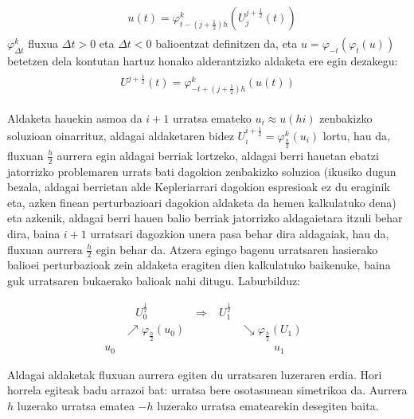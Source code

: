 \begin{align}\begin{split}
\label{eq: uUaldaketa}
&u(t) = \varphi_{t-(j+\frac{1}{2})h}^k\left(U_j^{j+\frac{1}{2}}(t)\right)
\end{split}
\end{align} 
$\varphi_{\Delta t}^k$ fluxua $\Delta t>0$ eta $\Delta t <0$ balioentzat definitzen da, eta  $u= \varphi_{-t}(\varphi_{t}(u))$ betetzen dela kontutan hartuz honako alderantzizko aldaketa ere egin dezakegu:
\begin{align}
\begin{split}
\label{eq: Uualdaketa}
U^{j+\frac{1}{2}}(t) = \varphi^k_{-t+(j+\frac{1}{2})h} \left( u(t) \right)
\end{split}
\end{align} 

Aldaketa hauekin asmoa da $i+1$ urratsa emateko $u_i \approx u(hi)$ zenbakizko soluzioan oinarrituz, aldagai aldaketaren bidez $U_i^{i+\frac{1}{2}}=\varphi^k_{\frac{h}{2}}(u_i)$ lortu, hau da, fluxuan $\frac{h}{2}$ aurrera egin aldagai berriak lortzeko, aldagai berri hauetan ebatzi jatorrizko problemaren urrats bati dagokion zenbakizko soluzioa (ikusiko dugun bezala, aldagai berrietan alde Kepleriarrari dagokion espresioak ez du eraginik eta, azken finean perturbazioari dagokion aldaketa da hemen kalkulatuko dena) eta azkenik, aldagai berri hauen balio berriak jatorrizko aldagaietara itzuli behar dira, baina $i+1$ urratsari dagozkion unera pasa behar dira aldagaiak, hau da, fluxuan aurrera $\frac{h}{2}$ egin behar da. Atzera egingo bagenu urratsaren hasierako balioei perturbazioak zein aldaketa eragiten dien kalkulatuko baikenuke, baina guk urratsaren bukaerako balioak nahi ditugu. Laburbilduz:


\begin{align*}
   &   \quad U_0^{\frac{1}{2}} \quad \quad \quad \quad \Longrightarrow  & U_1^{\frac{1}{2}}&  &\\
  & \nearrow \varphi_{\frac{h}{2}}(u_0) &            & \searrow \varphi_{\frac{h}{2}}(U_1)& \\
u_0 &                  &    &\quad \quad \quad  u_1
\end{align*}

Aldagai aldaketak fluxuan aurrera egiten du urratsaren luzeraren erdia. Hori horrela egiteak badu arrazoi bat: urratsa bere osotasunean simetrikoa da. Aurrera $h$ luzerako urratsa ematea $-h$ luzerako urratsa ematearekin desegiten baita. 


